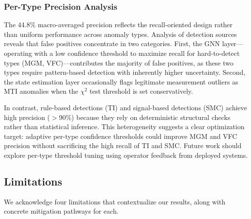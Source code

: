 \documentclass[research]{fcs}
\begin{document}
\subsubsection{Per-Type Precision Analysis}

The 44.8\% macro-averaged precision reflects the recall-oriented design rather than uniform performance across anomaly types. Analysis of detection sources reveals that false positives concentrate in two categories. First, the GNN layer---operating with a low confidence threshold to maximize recall for hard-to-detect types (MGM, VFC)---contributes the majority of false positives, as these two types require pattern-based detection with inherently higher uncertainty. Second, the state estimation layer occasionally flags legitimate measurement outliers as MTI anomalies when the $\chi^2$ test threshold is set conservatively.

In contrast, rule-based detections (TI) and signal-based detections (SMC) achieve high precision ($>$90\%) because they rely on deterministic structural checks rather than statistical inference. This heterogeneity suggests a clear optimization target: adaptive per-type confidence thresholds could improve MGM and VFC precision without sacrificing the high recall of TI and SMC. Future work should explore per-type threshold tuning using operator feedback from deployed systems.

\subsection{Limitations}

We acknowledge four limitations that contextualize our results, along with concrete mitigation pathways for each.
\end{document}
